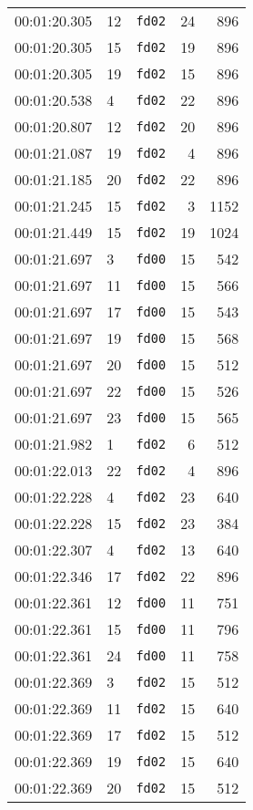 \documentclass{article}
\begin{document}
\begin{longtable}{lllrr}
00:01:20.305 & 12 & \texttt{fd02} & 24 & 896 \\
00:01:20.305 & 15 & \texttt{fd02} & 19 & 896 \\
00:01:20.305 & 19 & \texttt{fd02} & 15 & 896 \\
00:01:20.538 & 4 & \texttt{fd02} & 22 & 896 \\
00:01:20.807 & 12 & \texttt{fd02} & 20 & 896 \\
00:01:21.087 & 19 & \texttt{fd02} & 4 & 896 \\
00:01:21.185 & 20 & \texttt{fd02} & 22 & 896 \\
00:01:21.245 & 15 & \texttt{fd02} & 3 & 1152 \\
00:01:21.449 & 15 & \texttt{fd02} & 19 & 1024 \\
00:01:21.697 & 3 & \texttt{fd00} & 15 & 542 \\
00:01:21.697 & 11 & \texttt{fd00} & 15 & 566 \\
00:01:21.697 & 17 & \texttt{fd00} & 15 & 543 \\
00:01:21.697 & 19 & \texttt{fd00} & 15 & 568 \\
00:01:21.697 & 20 & \texttt{fd00} & 15 & 512 \\
00:01:21.697 & 22 & \texttt{fd00} & 15 & 526 \\
00:01:21.697 & 23 & \texttt{fd00} & 15 & 565 \\
00:01:21.982 & 1 & \texttt{fd02} & 6 & 512 \\
00:01:22.013 & 22 & \texttt{fd02} & 4 & 896 \\
00:01:22.228 & 4 & \texttt{fd02} & 23 & 640 \\
00:01:22.228 & 15 & \texttt{fd02} & 23 & 384 \\
00:01:22.307 & 4 & \texttt{fd02} & 13 & 640 \\
00:01:22.346 & 17 & \texttt{fd02} & 22 & 896 \\
00:01:22.361 & 12 & \texttt{fd00} & 11 & 751 \\
00:01:22.361 & 15 & \texttt{fd00} & 11 & 796 \\
00:01:22.361 & 24 & \texttt{fd00} & 11 & 758 \\
00:01:22.369 & 3 & \texttt{fd02} & 15 & 512 \\
00:01:22.369 & 11 & \texttt{fd02} & 15 & 640 \\
00:01:22.369 & 17 & \texttt{fd02} & 15 & 512 \\
00:01:22.369 & 19 & \texttt{fd02} & 15 & 640 \\
00:01:22.369 & 20 & \texttt{fd02} & 15 & 512 \\

\end{longtable}
\end{document}
